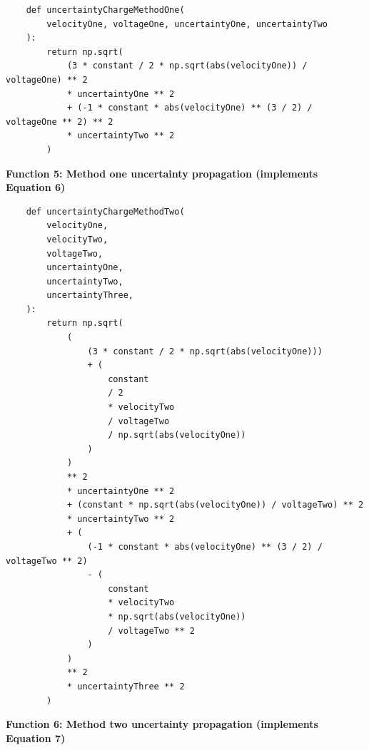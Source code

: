 \documentclass[
	letterpaper, %
	10pt, %
]{CSUniSchoolLabReport}
\begin{document}
\begin{verbatim}
    def uncertaintyChargeMethodOne(
        velocityOne, voltageOne, uncertaintyOne, uncertaintyTwo
    ):
        return np.sqrt(
            (3 * constant / 2 * np.sqrt(abs(velocityOne)) / voltageOne) ** 2
            * uncertaintyOne ** 2
            + (-1 * constant * abs(velocityOne) ** (3 / 2) / voltageOne ** 2) ** 2
            * uncertaintyTwo ** 2
        )
    \end{verbatim}
\begin{center}
    \textbf{Function 5: Method one uncertainty propagation (implements Equation 6)}
\end{center}
\newpage
\begin{verbatim}
    def uncertaintyChargeMethodTwo(
        velocityOne,
        velocityTwo,
        voltageTwo,
        uncertaintyOne,
        uncertaintyTwo,
        uncertaintyThree,
    ):
        return np.sqrt(
            (
                (3 * constant / 2 * np.sqrt(abs(velocityOne)))
                + (
                    constant
                    / 2
                    * velocityTwo
                    / voltageTwo
                    / np.sqrt(abs(velocityOne))
                )
            )
            ** 2
            * uncertaintyOne ** 2
            + (constant * np.sqrt(abs(velocityOne)) / voltageTwo) ** 2
            * uncertaintyTwo ** 2
            + (
                (-1 * constant * abs(velocityOne) ** (3 / 2) / voltageTwo ** 2)
                - (
                    constant
                    * velocityTwo
                    * np.sqrt(abs(velocityOne))
                    / voltageTwo ** 2
                )
            )
            ** 2
            * uncertaintyThree ** 2
        )
    \end{verbatim}
\begin{center}
    \textbf{Function 6: Method two uncertainty propagation (implements Equation 7)}
\end{center}
\end{document}
